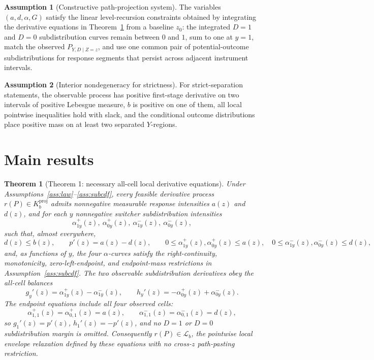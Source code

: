 \documentclass[11pt]{article}
\theoremstyle{definition}
\newtheorem{assumption}{Assumption}
\theoremstyle{plain}
\newtheorem{theorem}{Theorem}
\theoremstyle{remark}
\begin{document}
\begin{assumption}[Constructive path-projection system]\label{ass:constructive}
The variables \((a,d,\alpha,G)\) satisfy the linear level-recursion constraints obtained by integrating the derivative equations in Theorem~\ref{thm:necessary} from a baseline \(z_0\): the integrated \(D=1\) and \(D=0\) subdistribution curves remain between \(0\) and \(1\), sum to one at \(y=1\), match the observed \(P_{Y,D\mid Z=z}\), and use one common pair of potential-outcome subdistributions for response segments that persist across adjacent instrument intervals.
\end{assumption}

\begin{assumption}[Interior nondegeneracy for strictness]\label{ass:interior}
For strict-separation statements, the observable process has positive first-stage derivative on two intervals of positive Lebesgue measure, \(b\) is positive on one of them, all local pointwise inequalities hold with slack, and the conditional outcome distributions place positive mass on at least two separated \(Y\)-regions.
\end{assumption}

\section{Main results}
\begin{theorem}[Theorem 1: necessary all-cell local derivative equations]\label{thm:necessary}
Under Assumptions~\ref{ass:law}--\ref{ass:subcdf}, every feasible derivative process \(r(P)\in K_b^{\mathrm{proj}}\) admits nonnegative measurable response intensities \(a(z)\) and \(d(z)\), and for each \(y\) nonnegative switcher subdistribution intensities
\[
\alpha^+_{1y}(z),\ \alpha^+_{0y}(z),\ \alpha^-_{1y}(z),\ \alpha^-_{0y}(z),
\]
such that, almost everywhere,
\[
d(z)\le b(z),\qquad p'(z)=a(z)-d(z),\qquad
0\le \alpha^+_{1y}(z),\alpha^+_{0y}(z)\le a(z),\quad
0\le \alpha^-_{1y}(z),\alpha^-_{0y}(z)\le d(z),
\]
and, as functions of \(y\), the four \(\alpha\)-curves satisfy the right-continuity, monotonicity, zero-left-endpoint, and endpoint-mass restrictions in Assumption~\ref{ass:subcdf}.  The two observable subdistribution derivatives obey the all-cell balances
\[
g_y'(z)=\alpha^+_{1y}(z)-\alpha^-_{1y}(z),\qquad
h_y'(z)=-\alpha^+_{0y}(z)+\alpha^-_{0y}(z).
\]
The endpoint equations include all four observed cells:
\[
\alpha^+_{1,1}(z)=\alpha^+_{0,1}(z)=a(z),\qquad
\alpha^-_{1,1}(z)=\alpha^-_{0,1}(z)=d(z),
\]
so \(g_1'(z)=p'(z)\), \(h_1'(z)=-p'(z)\), and no \(D=1\) or \(D=0\) subdistribution margin is omitted.  Consequently \(r(P)\in\mathcal L_b\), the pointwise local envelope relaxation defined by these equations with no cross-\(z\) path-pasting restriction.
\end{theorem}
\end{document}
